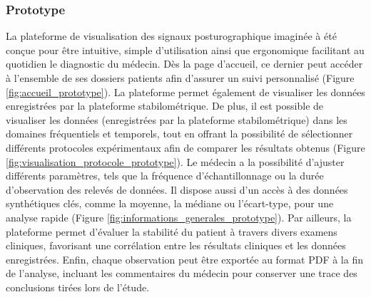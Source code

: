 \subsubsection{Prototype}

La plateforme de visualisation des signaux posturographique imaginée à été conçue pour être intuitive, simple d’utilisation ainsi que ergonomique facilitant au quotidien le diagnostic du médecin. 
Dès la page d’accueil, ce dernier peut accéder à l’ensemble de ses dossiers patients afin d’assurer un suivi personnalisé (Figure \ref{fig:accueil_prototype}). 
La plateforme permet également de visualiser les données enregistrées par la plateforme stabilométrique. 
De plus, il est possible de visualiser les données (enregistrées par la plateforme stabilométrique) dans les domaines fréquentiels et temporels, tout en offrant la possibilité de sélectionner différents protocoles expérimentaux afin de comparer les résultats obtenus (Figure \ref{fig:visualisation_protocole_prototype}). 
Le médecin a la possibilité d’ajuster différents paramètres, tels que la fréquence d’échantillonnage ou la durée d’observation des relevés de données.
Il dispose aussi d’un accès à des données synthétiques clés, comme la moyenne, la médiane ou l’écart-type, pour une analyse rapide (Figure \ref{fig:informations_generales_prototype}).
Par ailleurs, la plateforme permet d’évaluer la stabilité du patient à travers divers examens cliniques, favorisant une corrélation entre les résultats cliniques et les données enregistrées.
Enfin, chaque observation peut être exportée au format PDF à la fin de l’analyse, incluant les commentaires du médecin pour conserver une trace des conclusions tirées lors de l’étude.

